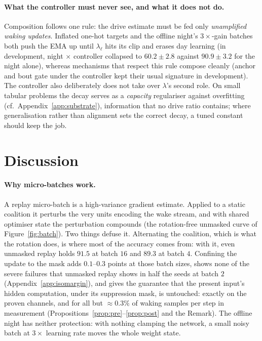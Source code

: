 \documentclass{article}
\begin{document}
\paragraph{What the controller must never see, and what it does not do.}
Composition follows one rule: the drive estimate must be fed only \emph{unamplified waking
updates}. Inflated one-hot targets and the offline night's $3\times$-gain batches both push
the EMA up until $\lambda_\ell$ hits its clip and erases day learning (in development, night
$\times$ controller collapsed to $60.2\pm2.8$ against $90.9\pm3.2$ for the night alone),
whereas mechanisms that respect this rule compose cleanly (anchor and bout gate under the
controller kept their usual signature in development). The controller also deliberately does
not take over $\lambda$'s second role. On small tabular problems the decay serves as a
\emph{capacity} regulariser against overfitting (cf.\ Appendix~\ref{app:substrate}),
information that no drive ratio contains; where generalisation rather than alignment sets
the correct decay, a tuned constant should keep the job.

\section{Discussion}
\label{sec:discussion}

\paragraph{Why micro-batches work.} A replay micro-batch is a high-variance gradient
estimate. Applied to a static coalition it perturbs the very units encoding the wake stream,
and with shared optimiser state the perturbation compounds (the rotation-free unmasked curve
of Figure~\ref{fig:batch}). Two things defuse it. Alternating the coalition, which is what
the rotation does, is where most of the accuracy comes from: with it, even unmasked replay
holds $91.5$ at batch $16$ and $89.3$ at batch $4$. Confining the update to the mask adds
$0.1$--$0.3$ points at those batch sizes, shows none of the severe failures that unmasked
replay shows in half the seeds at batch $2$ (Appendix~\ref{app:isomargin}), and gives the
guarantee that the present input's hidden computation, under its suppression mask, is
untouched: exactly on the proven channels, and for all but $\approx0.3\%$ of waking samples
per step in measurement (Propositions~\ref{prop:pre}--\ref{prop:post} and the Remark). The
offline night has neither protection: with nothing clamping the network, a small noisy batch
at $3\times$ learning rate moves the whole weight state.
\end{document}
